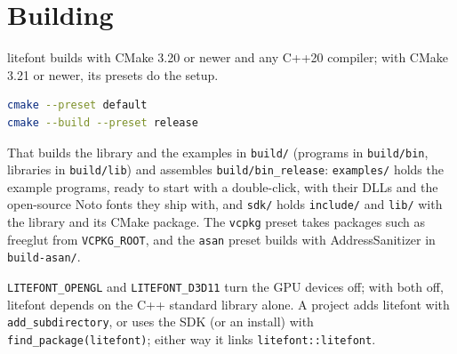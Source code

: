 \documentclass[11pt]{article}
\begin{document}
\section{Building}

litefont builds with CMake 3.20 or newer and any C++20 compiler; with CMake 3.21 or newer, its presets do the setup.
\begin{lstlisting}[language=bash]
cmake --preset default
cmake --build --preset release
\end{lstlisting}
That builds the library and the examples in \texttt{build/} (programs in \texttt{build/bin}, libraries in \texttt{build/lib}) and assembles \texttt{build/bin\_release}: \texttt{examples/} holds the example programs, ready to start with a double-click, with their DLLs and the open-source Noto fonts they ship with, and \texttt{sdk/} holds \texttt{include/} and \texttt{lib/} with the library and its CMake package. The \texttt{vcpkg} preset takes packages such as freeglut from \texttt{VCPKG\_ROOT}, and the \texttt{asan} preset builds with AddressSanitizer in \texttt{build-asan/}.

\texttt{LITEFONT\_OPENGL} and \texttt{LITEFONT\_D3D11} turn the GPU devices off; with both off, litefont depends on the C++ standard library alone. A project adds litefont with \texttt{add\_subdirectory}, or uses the SDK (or an install) with \texttt{find\_package(litefont)}; either way it links \texttt{litefont::litefont}.
\end{document}
